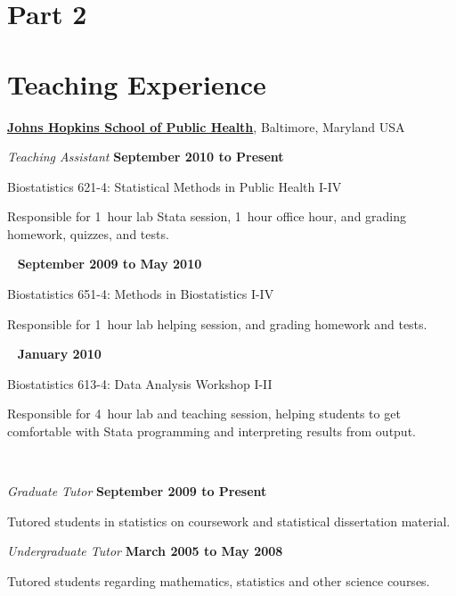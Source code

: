 \documentclass[11pt,a4paper]{moderncv}
\begin{document}
\newpage
\section{Part 2}



\section{ \large Teaching Experience}
\href{http://www.jhsph.edu}{\textbf{Johns Hopkins School of Public Health}},
Baltimore, Maryland USA
\begin{outerlist}

\item[] \textit{Teaching Assistant}%
    \hfill \textbf{September 2010 to Present}
    \begin{innerlist}
        \item Biostatistics 621-4: Statistical Methods in Public Health I-IV
        \begin{innerlist}
            \item Responsible for 1~hour lab Stata session, 1~hour office hour, and grading homework, quizzes, and tests.
            \end{innerlist}~
  \hfill \textbf{September 2009 to May 2010}
        \item Biostatistics 651-4: Methods in Biostatistics I-IV
        \begin{innerlist}
            \item Responsible for 1~hour lab helping session, and grading homework and tests.
            \end{innerlist}~
  \hfill \textbf{January 2010}
        \item Biostatistics 613-4: Data Analysis Workshop I-II
        \begin{innerlist}
             \item Responsible for 4~hour lab and teaching session, helping students to get comfortable with Stata programming and interpreting results from output.

        \end{innerlist}~
    \end{innerlist}

\item[] \textit{Graduate Tutor}%
        \hfill \textbf{September 2009 to Present}
\begin{innerlist}
\item Tutored students in statistics on coursework and statistical dissertation material.
\end{innerlist}
\item[] \textit{Undergraduate Tutor}%
        \hfill \textbf{March 2005 to May 2008}
\begin{innerlist}
\item Tutored students regarding mathematics, statistics and other science courses.
\end{innerlist}
        
\end{outerlist}
\end{document}
